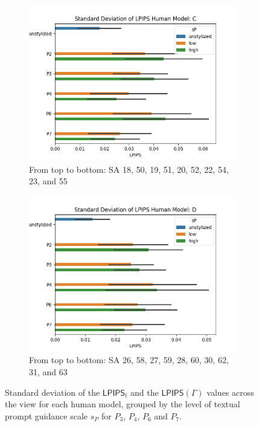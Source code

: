 \begin{figure}[ht]
\begin{subfigure}{0.49\textwidth}
		\includegraphics[width=\linewidth]{Figures/results/good/sd_lpips_irene.png}
		\caption{From top to bottom: SA 18, 50, 19, 51, 20, 52, 22, 54, 23, and 55}
	\end{subfigure}
	\begin{subfigure}{0.49\textwidth}
		\includegraphics[width=\linewidth]{Figures/results/good/sd_lpips_simon.png}
		\caption{From top to bottom: SA 26, 58, 27, 59, 28, 60, 30, 62, 31, and 63}
	\end{subfigure}
	\caption{Standard deviation of the $\mathsf{LPIPS}_{t}$ and the $\mathsf{LPIPS}(\varGamma)$ values across the view for each human model, grouped by the level of textual prompt guidance scale $s_P$ for $P_3$, $P_4$, $P_6$ and $P_7$.}
	\label{fig:sd_quantitative_distribution_lpips_good}
\end{figure}

